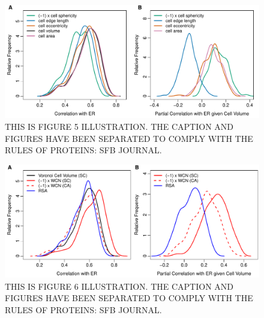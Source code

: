 \documentclass[12pt]{article}
\begin{document}
    \begin{figure}
        \begin{center}
        \includegraphics[width=6.5in]{best_voronoi_predictors_of_ER_screen_V.pdf}
        \end{center}
        \caption{THIS IS FIGURE 5 ILLUSTRATION. THE CAPTION AND FIGURES HAVE BEEN SEPARATED TO COMPLY WITH THE RULES OF PROTEINS: SFB JOURNAL.}
        \label{fig:voronoi_ER_screen}
    \end{figure}
    

    \begin{figure}
        \begin{center}
        \includegraphics[width=6.5in]{best_structural_predictors_of_ER_screen.pdf}
        \end{center}
        \caption{THIS IS FIGURE 6 ILLUSTRATION. THE CAPTION AND FIGURES HAVE BEEN SEPARATED TO COMPLY WITH THE RULES OF PROTEINS: SFB JOURNAL.}
        \label{fig:best_predictorER}
    \end{figure}
\end{document}
